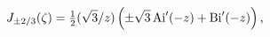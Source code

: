 \[\mathop{J_{\pm 2/3}\/}\nolimits\!\left(\zeta\right)=\tfrac{1}{2}(\sqrt{3}/z)%
\left(\pm\sqrt{3}\mathop{\mathrm{Ai}\/}\nolimits'\!\left(-z\right)+\mathop{%
\mathrm{Bi}\/}\nolimits'\!\left(-z\right)\right),\]